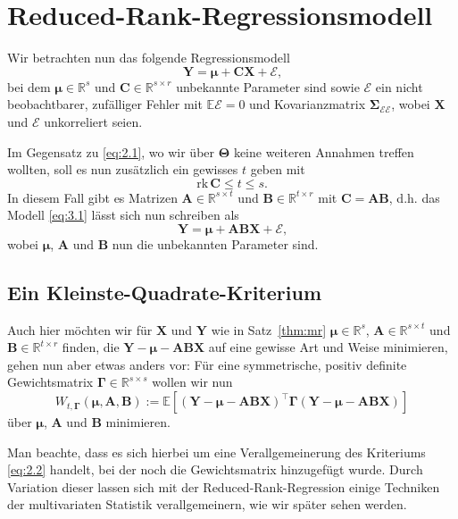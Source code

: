 \documentclass[]{article}
\newcommand{\E}{\mathbb{E}}
\newcommand{\R}{\mathbb{R}}
\newcommand{\X}{\mathbf{X}}
\newcommand{\Y}{\mathbf{Y}}
\newcommand{\T}{\mathbf{\Theta}}
\newcommand{\muu}{\bm{\mu}}
\newcommand{\Ssigma}{\mathbf{\Sigma}}
\newcommand{\C}{\mathbf{C}}
\newcommand{\rk}{\mathrm{rk}}
\newcommand{\A}{\mathbf{A}}
\newcommand{\B}{\mathbf{B}}
\newcommand{\Ggamma}{\mathbf{\Gamma}}
\begin{document}
\section{Reduced-Rank-Regressionsmodell}

Wir betrachten nun das folgende Regressionsmodell
\[\Y = \muu + \C \X + \mathcal{E} \text{,} \label{eq:3.1} \tag{3.1}\]
bei dem $\muu \in \R^s$ und $\C \in \R^{s \times r}$ unbekannte Parameter sind sowie $\mathcal{E}$ ein nicht beobachtbarer, zufälliger Fehler mit $\E \mathcal{E} = 0$ und Kovarianzmatrix $\Ssigma_{\mathcal{E} \mathcal{E}}$, wobei $\X$ und $\mathcal{E}$ unkorreliert seien. 

Im Gegensatz zu \eqref{eq:2.1}, wo wir über $\T$ keine weiteren Annahmen treffen wollten, soll es nun zusätzlich ein gewisses $t$ geben mit
$$ \rk \, \C \leq t \leq s \text{.}$$
In diesem Fall gibt es Matrizen $\A \in \R^{s \times t}$ und $\B \in \R^{t \times r}$ mit $\C = \A \B$, d.h. das Modell \eqref{eq:3.1}
lässt sich nun schreiben als
\[\Y = \muu + \A \B \X + \mathcal{E} \text{,} \label{eq:3.2} \tag{3.2}\]
wobei $\muu$, $\A$ und $\B$ nun die unbekannten Parameter sind.

\subsection*{Ein Kleinste-Quadrate-Kriterium}

Auch hier möchten wir für $\X$ und $\Y$ wie in Satz~\ref{thm:mr} $\muu \in \R^s$, $\A \in \R^{s \times t}$ und $\B \in \R^{t \times r}$ finden, die $\Y - \muu - \A \B \X$ auf eine gewisse Art und Weise minimieren, gehen nun aber etwas anders vor:
Für eine symmetrische, positiv definite Gewichtsmatrix $\Ggamma \in \R^{s \times s}$ wollen wir nun 
$$ W_{t, \Ggamma}(\muu, \A, \B) := \E[(\Y - \muu - \A \B \X)^{\top} \Ggamma (\Y - \muu - \A \B \X)]$$
über $\muu$, $\A$ und $\B$ minimieren. 

Man beachte, dass es sich hierbei um eine Verallgemeinerung des Kriteriums \eqref{eq:2.2} handelt, bei der noch die Gewichtsmatrix hinzugefügt wurde. Durch Variation dieser lassen sich mit der Reduced-Rank-Regression einige Techniken der multivariaten Statistik verallgemeinern, wie wir später sehen werden.
\end{document}
